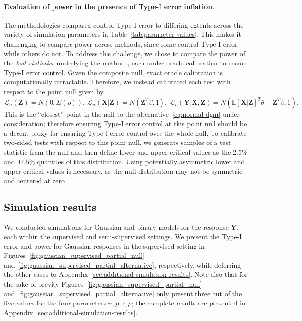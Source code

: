 \documentclass[12pt]{article}
\theoremstyle{definition}
\theoremstyle{remark}
\newcommand{\E}{\mathbb E}								%
\newcommand{\prx}{\bm X}								%
\newcommand{\prz}{\bm Z}								%
\newcommand{\pry}{{\bm Y}}								%
\newcommand{\law}{\mathcal L}							%
\begin{document}
	\paragraph{Evaluation of power in the presence of Type-I error inflation.}
	
	The methodologies compared control Type-I error to differing extents across the variety of simulation parameters in Table~\ref{tab:parameter-values}. This makes it challenging to compare power across methods, since some control Type-I error while others do not. To address this challenge, we chose to compare the power of the \textit{test statistics} underlying the methods, each under oracle calibration to ensure Type-I error control. Given the composite null, exact oracle calibration is computationally intractable. Therefore, we instead calibrated each test with respect to the point null given by 
	\begin{equation*}
		\law_n(\prz) = N(0, \Sigma(\rho)),\ \law_n(\prx | \prz) = N(\prz^T \beta, 1), \ \law_n(\pry|\prx,\prz) = N(\E[\prx|\prz]^T \theta + \prz^T \beta, 1).
	\end{equation*}
	This is the ``closest'' point in the null to the alternative~\eqref{eq:normal-dgm} under consideration; therefore ensuring Type-I error control at this point null should be a decent proxy for ensuring Type-I error control over the whole null. To calibrate two-sided tests with respect to this point null, we generate samples of a test statistic from the null and then define lower and upper critical values as the 2.5\% and 97.5\% quantiles of this distribution. Using potentially asymmetric lower and upper critical values is necessary, as the null distribution may not be symmetric and centered at zero \citep{Liu2022a}.
	
	\subsection{Simulation results} \label{sec:sim-results}
	
	We conducted simulations for Gaussian and binary models for the response $\pry$, each within the supervised and semi-supervised settings. We present the Type-I error and power for Gaussian responses in the supervised setting in Figures~\ref{fig:gaussian_supervised_partial_null} and~\ref{fig:gaussian_supervised_partial_alternative}, respectively, while deferring the other cases to Appendix~\ref{sec:additional-simulation-results}. Note also that for the sake of brevity Figures~\ref{fig:gaussian_supervised_partial_null} and~\ref{fig:gaussian_supervised_partial_alternative} only present three out of the five values for the four parameters $n, p, s, \rho$; the complete results are presented in Appendix~\ref{sec:additional-simulation-results}.
	
\end{document}
